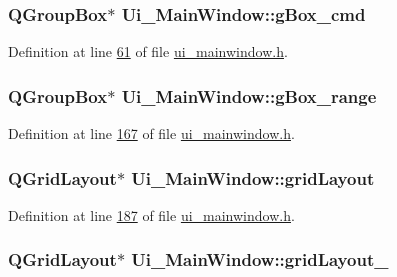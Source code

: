 \hypertarget{a00080_ad5c6667239e28060ba3b04ee0db97bac}{
\subsubsection[{g\+Box\+\_\+cmd}]{\setlength{\rightskip}{0pt plus 5cm}Q\+Group\+Box$\ast$ Ui\+\_\+\+Main\+Window\+::g\+Box\+\_\+cmd}}\label{a00080_ad5c6667239e28060ba3b04ee0db97bac}


Definition at line \hyperlink{a00139_source_l00061}{61} of file \hyperlink{a00139_source}{ui\+\_\+mainwindow.\+h}.

\hypertarget{a00080_a3c12d0504a310784c3820d1a9ad469c2}{
\subsubsection[{g\+Box\+\_\+range}]{\setlength{\rightskip}{0pt plus 5cm}Q\+Group\+Box$\ast$ Ui\+\_\+\+Main\+Window\+::g\+Box\+\_\+range}}\label{a00080_a3c12d0504a310784c3820d1a9ad469c2}


Definition at line \hyperlink{a00139_source_l00167}{167} of file \hyperlink{a00139_source}{ui\+\_\+mainwindow.\+h}.

\hypertarget{a00080_a525ed3c5fe0784ac502ee222fba4e205}{
\subsubsection[{grid\+Layout}]{\setlength{\rightskip}{0pt plus 5cm}Q\+Grid\+Layout$\ast$ Ui\+\_\+\+Main\+Window\+::grid\+Layout}}\label{a00080_a525ed3c5fe0784ac502ee222fba4e205}


Definition at line \hyperlink{a00139_source_l00187}{187} of file \hyperlink{a00139_source}{ui\+\_\+mainwindow.\+h}.

\hypertarget{a00080_a79b264e6945e3b94a511427b1c270dd7}{
\subsubsection[{grid\+Layout\+\_\+10}]{\setlength{\rightskip}{0pt plus 5cm}Q\+Grid\+Layout$\ast$ Ui\+\_\+\+Main\+Window\+::grid\+Layout\+\_}}\label{a00080_a79b264e6945e3b94a511427b1c270dd7}


